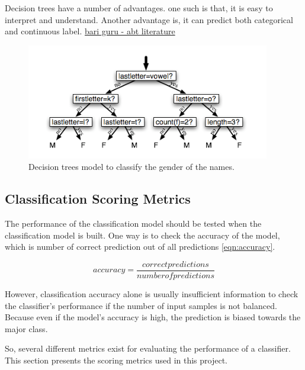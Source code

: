 Decision trees have a number of advantages. one such is that, it is easy to interpret and understand. Another advantage is, it can predict both categorical and continuous label. \underline{bari guru - abt literature }



\begin{figure}
	\centering
	\includegraphics[width=0.5\linewidth]{images/Decisiontrees.png}
	\caption{Decision trees model to classify the gender of the names.}
	\label{fig:Decision_tree}
\end{figure}

\subsection{Classification Scoring Metrics} \label{scoringmetrics} \label{metricsofclassification}

The performance of the classification model should be tested when the classification model is built. One way is to check the accuracy of the model, which is number of correct prediction out of all predictions \ref{eqn:accuracy}. 


\begin{equation}
\label{eqn:accuracy}
accuracy = \frac{correct predictions}{number of predictions}
\end{equation}

However, classification accuracy alone is usually insufficient information to check the classifier's performance if the number of input samples is not balanced. Because even if the model's accuracy is high, the prediction is biased towards the major class. 

So, several different metrics exist for evaluating the performance of a classifier. This section presents the scoring metrics used in this project.

